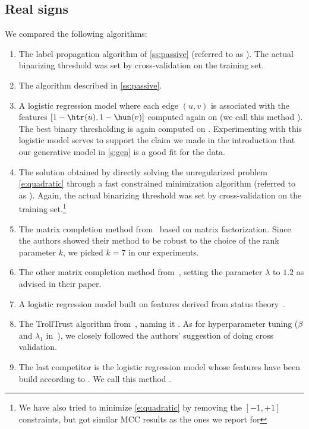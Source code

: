 \subsection{Real signs} 
We compared the following algorithms:

\begin{enumerate}[label=\textbf{\arabic*.}]
  \item The label propagation algorithm of \autoref{ss:passive} (referred to as \uslpropGsec{}).
    The actual binarizing threshold was set by cross-validation on the training set.

  \item The \usrule{} algorithm described in \autoref{ss:passive}.

  \item A logistic regression model where each edge $(u,v)$ is associated with the features
    $[1-\htr(u), 1-\hun(v)]$ computed again on \trainset{} (we call this method \uslogregp{}). The best
    binary thresholding is again computed on \trainset{}. Experimenting with this logistic model
    serves to support the claim we made in the introduction that our generative model in
    \autoref{s:gen} is a good fit for the data.

  \item  The solution obtained by directly solving the unregularized problem \eqref{e:quadratic}
    through a fast constrained minimization algorithm (referred to as \qoptim{}). Again, the actual
    binarizing threshold was set by cross-validation on the training set.\footnote{We have also
    tried to minimize \eqref{e:quadratic} by removing the $[-1,+1]$ constraints, but got similar MCC
    results as the ones we report for \qoptim{}}

  \item  The matrix completion method from~\autocite{LowRankCompletion14} based on \complowrank{}
    matrix factorization. Since the authors showed their method to be robust to the choice of the
    rank parameter $k$, we picked $k=7$ in our experiments.

  \item The other \compmaxnorm{} matrix completion method from~\autocite{OnlineCompletion17},
    setting the parameter $\lambda$ to $1.2$ as advised in their paper.

  \item A logistic regression model built on \comptriads{} features derived from status
    theory~\autocite{Leskovec2010}.

  \item The TrollTrust algorithm from~\autocite{wu2016troll}, naming it \compranknodes{}. As for
    hyperparameter tuning ($\beta$ and $\lambda_1$ in~\autocite{wu2016troll}), we closely followed
    the authors' suggestion of doing cross validation.

  \item  The last competitor is the logistic regression model whose features have been build
    according to \autocite{Bayesian15}. We call this method \compbayesian{}.
\end{enumerate}


